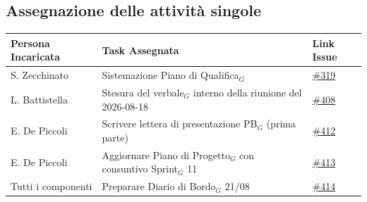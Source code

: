 \documentclass[a4paper, 10pt, colorlinks=true, linkcolor=black, urlcolor=blue, citecolor=blue, hidelinks]{article}
\newcommand{\issue}[1]{\href{https://github.com/thebitless-group-swe/thebitless.github.io/issues/#1}{\##1}}
\begin{document}
\subsection{Assegnazione delle attività singole}
\begin{center}
    \renewcommand{\arraystretch}{1.4}
        \begin{tabular}{|p{4.2cm}|p{6.2cm}|p{2.2cm}|}
        \hline
        \textbf{Persona Incaricata} & \textbf{Task Assegnata} & \centering\textbf{Link Issue} \tabularnewline
        
        \hline
        S. Zecchinato & Sistemazione Piano di Qualifica$_G$ & \issue{319} \\
        \hline
        L. Battistella & Stesura del verbale$_G$ interno della riunione del 2026-08-18 & \issue{408} \\
        \hline
        E. De Piccoli & Scrivere lettera di presentazione PB$_G$ (prima parte) & \issue{412} \\
        \hline
        E. De Piccoli & Aggiornare Piano di Progetto$_G$ con consuntivo Sprint$_G$ 11 & \issue{413} \\
        \hline
        Tutti i componenti & Preparare Diario di Bordo$_G$ 21/08 & \issue{414} \\
        \hline
    \end{tabular}
\end{center}

\appendix
\end{document}
